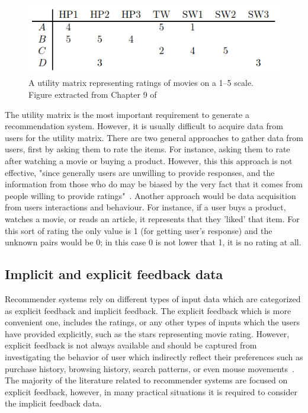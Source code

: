\begin{figure}[ht]
  \centering
  \includegraphics[width=\textwidth]{figures/utilityMatrix.png}
  \caption{A utility matrix representing ratings of movies on a 1–5 scale. Figure extracted from Chapter 9 of~\cite{rajaraman2011mining}}
  \label{fig:utilityMatrix}
\end{figure} 


The utility matrix is the most important requirement to generate a recommendation system. However, it is usually difficult to acquire data from users for the utility matrix. There are two general approaches to gather data from users, first by asking them to rate the items. For instance, asking them to rate after watching a movie or buying a product. However, this this approach is not eﬀective, "since generally
users are unwilling to provide responses, and the information from those
who do may be biased by the very fact that it comes from people willing
to provide ratings"~\cite{rajaraman2011mining}. Another approach would be data acquisition from users interactions and behaviour. For instance, if a user
buys a product, watches a movie, or reads an article, it represents that they 'liked' that item. For this sort of rating the only value is 1 (for getting user's response) and the unknown pairs would be 0; in this case 0 is not lower that 1, it is no rating at all.


\subsection{Implicit and explicit feedback data}

Recommender systems rely on different types of input data which are categorized as explicit feedback and implicit feedback.
The explicit feedback which is more convenient one, includes the ratings, or any other types of inputs which the users have provided explicitly, such as the stars representing movie rating. However, explicit feedback is not always available and should be captured from investigating the behavior of user which indirectly reflect their preferences such as purchase history, browsing history, search patterns, or even mouse movements~\cite{hu2008collaborative}. The majority of the literature related to recommender systems are focused on explicit feedback, however, in many practical situations it is required to consider the implicit feedback data. 

